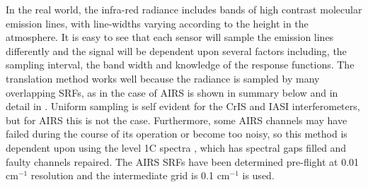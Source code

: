 \documentclass[twocolumn,10pt]{article}
\begin{document}
In the real world, the infra-red radiance includes bands of high contrast molecular emission lines, with line-widths varying according to the height in the atmosphere. It is easy to see that each sensor will sample the emission lines differently and the signal will be dependent upon several factors including, the sampling interval, the band width and knowledge of the response functions. The translation method works well because the radiance is sampled by many overlapping SRFs, as in the case of AIRS is shown in summary below and in detail in \cite{Motteler2017a}. Uniform sampling is self evident for the CrIS and IASI interferometers, but for AIRS this is not the case. Furthermore, some AIRS channels may have failed during the course of its operation or become too noisy, so this method is dependent upon using the level 1C spectra \cite{Manning2015}, which has spectral gaps filled and faulty channels repaired. The AIRS SRFs have been determined pre-flight at 0.01 cm$^{-1}$ resolution and the intermediate grid is 0.1 cm$^{-1}$ is used.



\end{document}
